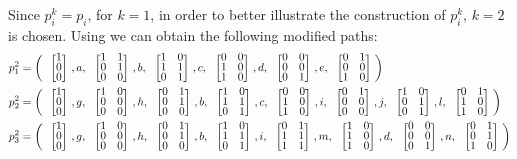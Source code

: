Since $p_i^k=p_i$, for $k=1$, in order to better illustrate the
construction of $p_i^k$, $k=2$ is chosen. Using  we can
obtain the following modified paths: 
\begin{align*}
  p_1^2&= \left(\colvec{1\\0\\0},a,\colvec{1&1\\0&1\\0&0},b,\colvec{1&0\\1&1\\0&1},c,\colvec{0&0\\1&0\\1&0},d,\colvec{0&0\\0&0\\0&1},e,\colvec{0&1\\0&0\\1&0}\right) \\
  p_2^2&= \left(\colvec{1\\0\\0},g,\colvec{1&0\\0&0\\0&0},h,\colvec{0&1\\0&1\\0&0},b,\colvec{1&0\\1&1\\0&1},c,\colvec{0&0\\1&0\\1&0},i,\colvec{0&1\\0&0\\0&0},j,\colvec{1&0\\0&1\\0&1},l,\colvec{0&1\\1&0\\1&0}\right) \\
  p_3^2&= \left(\colvec{1\\0\\0},g,\colvec{1&0\\0&0\\0&0},h,\colvec{0&1\\0&1\\0&0},b,\colvec{1&0\\1&1\\0&1},i,\colvec{0&1\\1&1\\1&1},m,\colvec{1&0\\1&0\\1&0},d,\colvec{0&0\\0&0\\0&1},n,\colvec{0&1\\0&1\\1&0}\right) \\
\end{align*}

